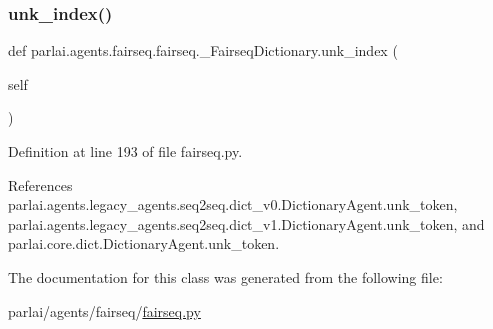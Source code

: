 \subsubsection{\texorpdfstring{unk\+\_\+index()}{unk\_index()}}
{\footnotesize\ttfamily def parlai.\+agents.\+fairseq.\+fairseq.\+\_\+\+Fairseq\+Dictionary.\+unk\+\_\+index (\begin{DoxyParamCaption}\item[{}]{self }\end{DoxyParamCaption})}



Definition at line 193 of file fairseq.\+py.



References parlai.\+agents.\+legacy\+\_\+agents.\+seq2seq.\+dict\+\_\+v0.\+Dictionary\+Agent.\+unk\+\_\+token, parlai.\+agents.\+legacy\+\_\+agents.\+seq2seq.\+dict\+\_\+v1.\+Dictionary\+Agent.\+unk\+\_\+token, and parlai.\+core.\+dict.\+Dictionary\+Agent.\+unk\+\_\+token.



The documentation for this class was generated from the following file\+:\begin{DoxyCompactItemize}
\item 
parlai/agents/fairseq/\hyperlink{fairseq_8py}{fairseq.\+py}\end{DoxyCompactItemize}
